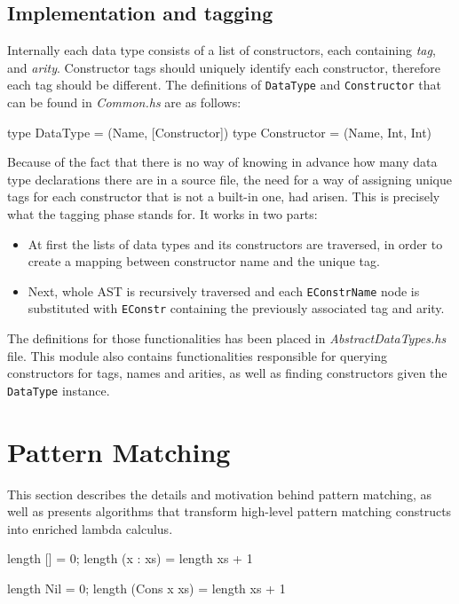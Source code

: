 \documentclass[12pt,a4paper]{report}
\begin{document}
\subsection{Implementation and tagging}
Internally each data type consists of a list of constructors, each containing
\textit{tag}, and \textit{arity}. Constructor tags should uniquely identify
each constructor, therefore each tag should be different. The definitions of
\texttt{DataType} and \texttt{Constructor} that can be found in
\textit{Common.hs} are as follows:

\vspace*{0.2in}
\begin{code}[style=haskell]
  type DataType = (Name, [Constructor])
  type Constructor = (Name, Int, Int)
\end{code}

Because of the fact that there is no way of knowing in advance how many data
type declarations there are in a source file, the need for a way of assigning
unique tags for each constructor that is not a built-in one, had arisen.  This
is precisely what the tagging phase stands for. It works in two parts:

\begin{itemize}
  \item At first the lists of data types and its constructors are traversed, in
    order to create a mapping between constructor name and the unique tag.
  \item Next, whole AST is recursively traversed and each \texttt{EConstrName}
    node is substituted with \texttt{EConstr} containing the previously
    associated tag and arity.
\end{itemize}

The definitions for those functionalities has been placed in
\textit{AbstractDataTypes.hs} file. This module also contains functionalities
responsible for querying constructors for tags, names and arities, as well as
finding constructors given the \texttt{DataType} instance.


\section{Pattern Matching}
This section describes the details and motivation behind pattern matching, as
well as presents algorithms that transform high-level pattern matching
constructs into enriched lambda calculus.

\vspace*{0.2in}
\begin{code}[style=haskell,label=lst:length,caption={Calculating length of a list.}]
  length [] = 0;
  length (x : xs) = length xs + 1

  length Nil = 0;
  length (Cons x xs) = length xs + 1
\end{code}
\end{document}
